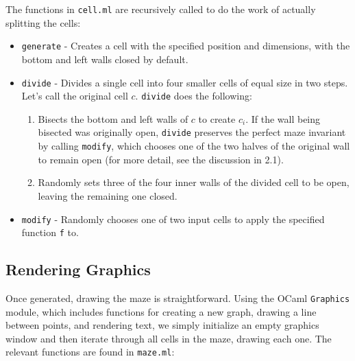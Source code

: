 \documentclass[11pt, margin=1in]{article}
\begin{document}
The functions in \texttt{cell.ml} are recursively called to do the work of actually splitting the cells:
\begin{itemize}
\item \texttt{generate} - Creates a cell with the specified position and dimensions, with the bottom and left walls closed by default. 
\item \texttt{divide} - Divides a single cell into four smaller cells of equal size in two steps. Let's call the original cell $c$. \texttt{divide} does the following: 
\begin{enumerate}
\item Bisects the bottom and left walls of $c$ to create $c_i$. If the wall being bisected was originally open, \texttt{divide} preserves the perfect maze invariant by calling \texttt{modify}, which chooses one of the two halves of the original wall to remain open (for more detail, see the discussion in 2.1). 

\item Randomly sets three of the four inner walls of the divided cell to be open, leaving the remaining one closed.  
\end{enumerate}
\item \texttt{modify} - Randomly chooses one of two input cells to apply the specified function \texttt{f} to. 
\end{itemize}

\subsection{Rendering Graphics} %
Once generated, drawing the maze is straightforward. Using the OCaml \texttt{Graphics} module, which includes functions for creating a new graph, drawing a line between points, and rendering text, we simply initialize an empty graphics window and then iterate through all cells in the maze, drawing each one. The relevant functions are found in \texttt{maze.ml}:
\end{document}
